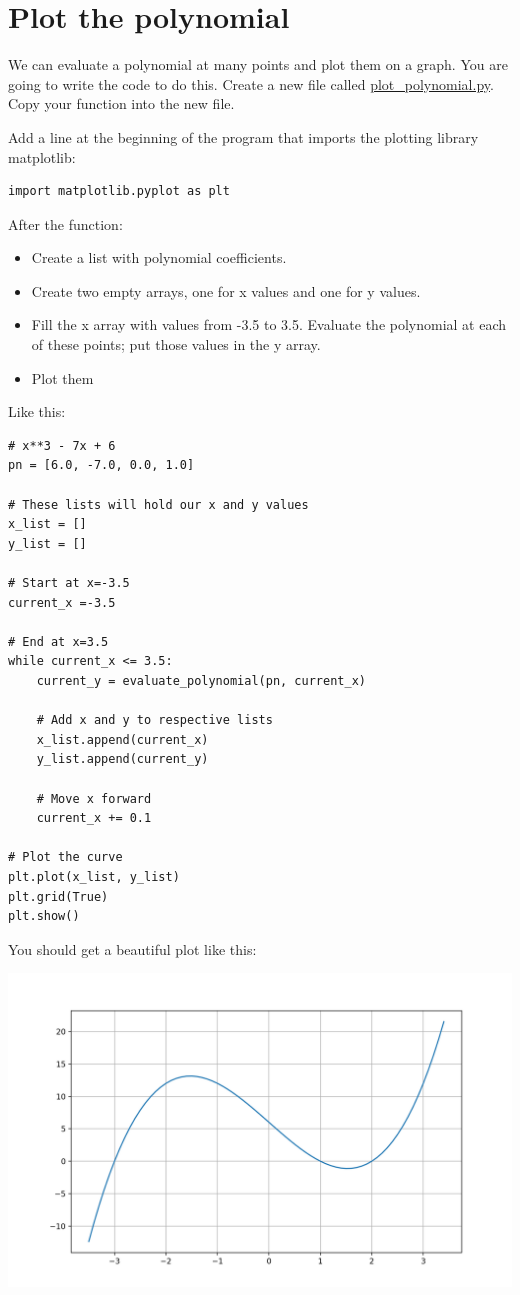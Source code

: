 \section{Plot the polynomial}

We can evaluate a polynomial at many points and plot them on a
graph. You are going to write the code to do this.  Create a new file
called \url{plot_polynomial.py}. Copy your 
function into the new file.

Add a line at the beginning of the program that imports the plotting library matplotlib:
\begin{Verbatim}
import matplotlib.pyplot as plt
\end{Verbatim}

After the  function:
\begin{itemize}
\item Create a list with polynomial coefficients.
\item Create two empty arrays, one for x values and one for y values.
\item Fill the x array with values from -3.5 to 3.5. Evaluate the polynomial at each of these points; put those values
  in the y array.
\item Plot them
\end{itemize}

Like this:
\begin{Verbatim}
# x**3 - 7x + 6
pn = [6.0, -7.0, 0.0, 1.0]

# These lists will hold our x and y values
x_list = []
y_list = []

# Start at x=-3.5
current_x =-3.5

# End at x=3.5
while current_x <= 3.5:
    current_y = evaluate_polynomial(pn, current_x)

    # Add x and y to respective lists
    x_list.append(current_x)
    y_list.append(current_y)

    # Move x forward
    current_x += 0.1

# Plot the curve
plt.plot(x_list, y_list)
plt.grid(True)
plt.show()
\end{Verbatim}

You should get a beautiful plot like this:

\includegraphics[width=\textwidth]{polyplot1.png}

